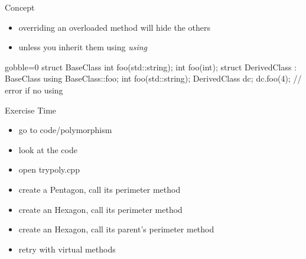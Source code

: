 \begin{frame}[fragile]
  \begin{block}{Concept}
    \begin{itemize}
    \item overriding an overloaded method will hide the others
    \item unless you inherit them using {\it using}
    \end{itemize}
  \end{block}
  \begin{cppcode*}{gobble=0}
    struct BaseClass {
      int foo(std::string);
      int foo(int);
    }
    struct DerivedClass : BaseClass {
      using BaseClass::foo;
      int foo(std::string);
    }
    DerivedClass dc;
    dc.foo(4);      // error if no using
    \end{cppcode*}
\end{frame}

\begin{frame}[fragile]
  \begin{alertblock}{Exercise Time}
    \begin{itemize}
    \item go to code/polymorphism
    \item look at the code
    \item open trypoly.cpp
    \item create a Pentagon, call its perimeter method
    \item create an Hexagon, call its perimeter method
    \item create an Hexagon, call its parent's perimeter method
    \item retry with virtual methods
    \end{itemize}
  \end{alertblock}
\end{frame}

